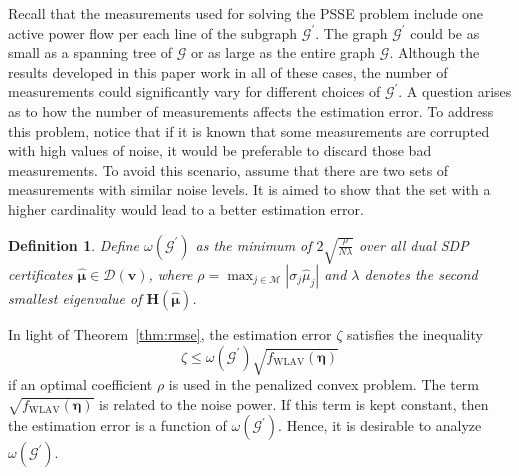\documentclass[journal,twoside]{IEEEtran}
\newtheorem{definition}{Definition}
\newcommand{\myexp}{\mathrm{e}}
\newcommand{\cG}{{\mathcal G}}
\newcommand{\cM}{{\mathcal M}}
\begin{document}
%



Recall that the measurements used for solving the PSSE problem include one active power flow per each line of the subgraph $\cG^{\prime}$. The graph $\cG^{\prime}$ could be as small as a spanning tree of $\mathcal G$ or as large as the entire graph $\mathcal G$. Although the results developed in this paper work in all of these cases, the number of measurements could significantly vary for different choices of $\cG^{\prime}$. A question arises as to how the number of measurements affects the estimation error. To address this problem, notice that if it is known that some measurements are corrupted with high values of noise, it would be preferable to discard those bad measurements.  To avoid this scenario,  assume that there are two sets of measurements with similar noise levels. It is aimed to show that the set with a higher cardinality would lead to a better estimation error.

\begin{definition} \label{def:dd1} Define $\omega (\cG^{\prime})$ as the minimum of $2\sqrt{\frac{\rho}{N\lambda}}$ over all  dual SDP certificates $\hat{\boldsymbol{\mu}}\in\mathcal{D}(\mathbf{v})$, where $\rho= \max_{j\in\cM} |\sigma_j\hat{\mu}_j|$ and $\lambda$ denotes the second smallest eigenvalue of $\mathbf{H}(\hat{\boldsymbol{\mu}})$.
\end{definition}

In light of Theorem~\ref{thm:rmse},
the  estimation error $\zeta$ satisfies the inequality
\begin{equation}
\zeta\leq \omega (\cG^{\prime}) \sqrt{f_{\mathrm{WLAV}}(\boldsymbol{\eta})}
\end{equation}
if an optimal coefficient $\rho$ is used in the penalized convex problem. The term $ \sqrt{f_{\mathrm{WLAV}}(\boldsymbol{\eta})}$ is related to the noise power. If this term is kept constant, then the estimation error is a function of $\omega (\cG^{\prime})$. Hence, it is desirable to analyze $\omega (\cG^{\prime})$.
\end{document}
